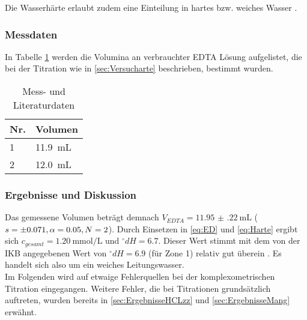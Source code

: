 \documentclass{article}
\begin{document}
        Die Wasserhärte erlaubt zudem eine Einteilung in hartes bzw. weiches Wasser \cite{Wasserharte}.
        
      \subsubsection{Messdaten}
        
        In Tabelle \ref{tab:MessdatenHarte} werden die Volumina an verbrauchter EDTA Lösung aufgelistet, die bei der Titration wie in \ref{sec:Versucharte} beschrieben, bestimmt wurden. 
        
        \begin{table}[H]
          \centering
          \caption[Messdaten der Bestimmung der Gesamthärte von Leitungswasser, Quelle: Autor]{Mess- und Literaturdaten}
          \label{tab:MessdatenHarte}
            \begin{tabular}{@{}l|l@{}}
              \toprule
               Nr. & Volumen \\ \midrule
               1 & \SI[mode=text]{11.9}{\milli\liter} \\
               2 & \SI[mode=text]{12.0}{\milli\liter} \\ \bottomrule
            \end{tabular}
        \end{table} 
        
      \subsubsection{Ergebnisse und Diskussion}  \label{sec:KomplexeErgebnisse}   
      
        Das gemessene Volumen beträgt demnach $V_{EDTA} = \SI[mode=text,separate-uncertainty]{11.95(22)}{\milli\liter}$ ($s = \num{\pm 0.071}, \alpha=0.05,N=2$). Durch Einsetzen in \eqref{eq:ED} und \eqref{eq:Harte} ergibt sich $c_{gesamt} = \SI[mode=text]{1.20}{\milli\mole\per\liter}$ und $^\circ dH = 6.7$. Dieser Wert stimmt mit dem von der IKB angegebenen Wert von $^\circ dH = 6.9$ (für Zone 1) relativ gut überein \cite{ikb}. Es handelt sich also um ein weiches Leitungswasser. \\
        
        Im Folgenden wird auf etwaige Fehlerquellen bei der komplexometrischen Titration eingegangen. Weitere Fehler, die bei Titrationen grundsätzlich auftreten, wurden bereits in \ref{sec:ErgebnisseHCLzz} und \ref{sec:ErgebnisseMang} erwähnt.  
        
\end{document}
